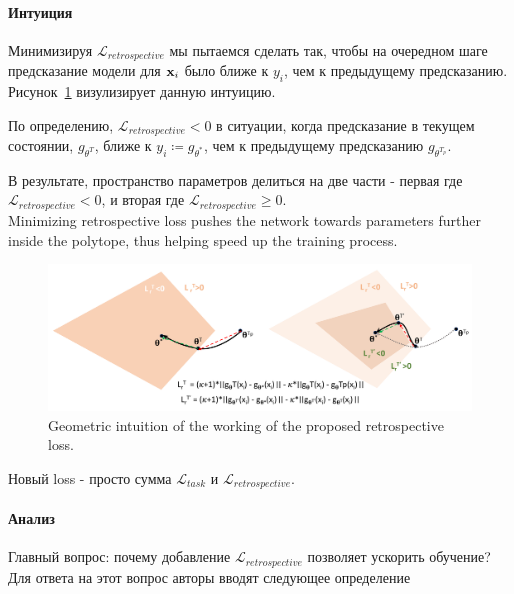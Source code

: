 \paragraph{Интуиция} Минимизируя $\mathcal{L}_{retrospective}$ мы пытаемся сделать так, чтобы на очередном шаге предсказание модели для ${\bf x}_i$ было ближе к $y_i$, чем к предыдущему предсказанию. \\

Рисунок~\ref{fig:geom_intuition} визулизирует данную интуицию. 

По определению, $\mathcal{L}_{retrospective} < 0$ в ситуации, когда предсказание в текущем состоянии, $g_{\theta^T}$, ближе к $y_i \coloneqq g_{\theta^{*}}$, чем к предыдущему предсказанию $g_{\theta^{T_p}}$. 

В результате, пространство параметров делиться на две части - первая где $\mathcal{L}_{retrospective} < 0$, и  вторая где $\mathcal{L}_{retrospective} \geq 0$. \\

Minimizing retrospective loss pushes the network towards parameters further inside the polytope, thus helping speed up the training process. \\

\begin{figure}
    \centering
    \includegraphics[width=0.8\linewidth]{images/dualing_loss_viz.png}
    \caption{Geometric intuition of the working of the proposed retrospective loss.}
    \label{fig:geom_intuition}
\end{figure}

Новый loss - просто сумма $\mathcal{L}_{task}$ и $\mathcal{L}_{retrospective}$. 

\paragraph{Анализ} Главный вопрос: почему добавление $\mathcal{L}_{retrospective}$ позволяет ускорить обучение? \\

Для ответа на этот вопрос авторы вводят следующее определение


